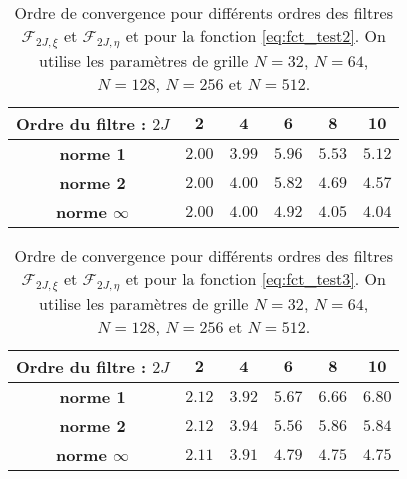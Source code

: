 \begin{table}[htbp]
\begin{center}
\begin{tabular}{|c||c|c|c|c|c|}
\hline
\textbf{Ordre du filtre :} $2J$ & $\mathbf{2}$ & $\mathbf{4}$ & $\mathbf{6}$ & $\mathbf{8}$ & $\mathbf{10}$ \\
\hline
\hline
\textbf{norme 1}& $2.00$ & $3.99$ & $5.96$ & $5.53$ & $5.12$\\
\textbf{norme 2} & $2.00$ & $4.00$ & $5.82$ & $4.69$ & $4.57$\\
\textbf{norme $\infty$} & $2.00$ & $4.00$ & $4.92$ & $4.05$ & $4.04$\\
\hline
\end{tabular}
\end{center}
\caption{Ordre de convergence pour différents ordres des filtres $\mathcal{F}_{2J,\xi}$ et $\mathcal{F}_{2J,\eta}$ et pour la fonction \eqref{eq:fct_test2}. On utilise les paramètres de grille $N=32$, $N=64$, $N=128$, $N=256$ et $N=512$.}
\label{tab:rate_fct2}
\end{table} 

\begin{table}[htbp]
\begin{center}
\begin{tabular}{|c||c|c|c|c|c|}
\hline
\textbf{Ordre du filtre :} $2J$ & $\mathbf{2}$ & $\mathbf{4}$ & $\mathbf{6}$ & $\mathbf{8}$ & $\mathbf{10}$ \\
\hline
\hline
\textbf{norme 1} & $2.12$ & $3.92$ & $5.67$ & $6.66$ & $6.80$\\
\textbf{norme 2} & $2.12$ & $3.94$ & $5.56$ & $5.86$ & $5.84$\\
\textbf{norme $\infty$} & $2.11$ & $3.91$ & $4.79$ & $4.75$ & $4.75$\\
\hline
\end{tabular}
\end{center}
\caption{Ordre de convergence pour différents ordres des filtres $\mathcal{F}_{2J,\xi}$ et $\mathcal{F}_{2J,\eta}$ et pour la fonction \eqref{eq:fct_test3}. On utilise les paramètres de grille $N=32$, $N=64$, $N=128$, $N=256$ et $N=512$.}
\label{tab:rate_fct3}
\end{table} 




















